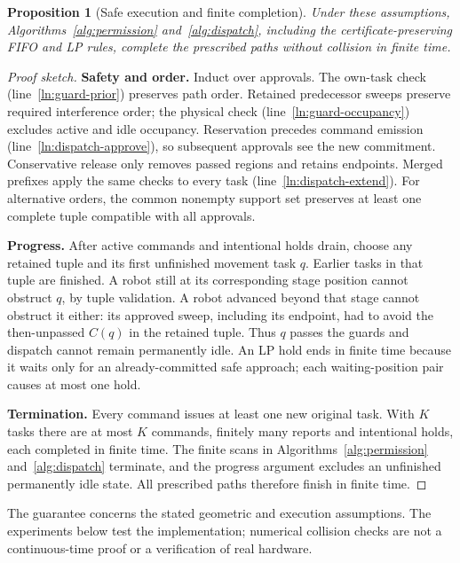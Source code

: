 \documentclass[11pt,a4paper]{article}
\newtheorem{proposition}{Proposition}
\theoremstyle{remark}
\begin{document}
\begin{proposition}[Safe execution and finite completion]
\label{prop:ordered}
\label{prop:controller}
\label{prop:policy-completion}
Under these assumptions, Algorithms~\ref{alg:permission} and~\ref{alg:dispatch},
including the certificate-preserving FIFO and LP rules, complete the
prescribed paths without collision in finite time.
\end{proposition}
\begin{proof}[Proof sketch]
\textbf{Safety and order.} Induct over approvals. The own-task check
(line~\ref{ln:guard-prior}) preserves path order. Retained predecessor sweeps
preserve required interference order; the physical check
(line~\ref{ln:guard-occupancy}) excludes active and idle occupancy.
Reservation precedes command emission (line~\ref{ln:dispatch-approve}),
so subsequent approvals see the new commitment. Conservative release only
removes passed regions and retains endpoints. Merged prefixes apply the
same checks to every task (line~\ref{ln:dispatch-extend}). For alternative
orders, the common nonempty support set preserves at least one complete
tuple compatible with all approvals.

\textbf{Progress.} After active commands and intentional holds drain,
choose any retained tuple and its first unfinished movement task $q$.
Earlier tasks in that tuple are finished. A robot still at its corresponding
stage position cannot obstruct $q$, by tuple validation. A robot advanced
beyond that stage cannot obstruct it either: its approved sweep, including
its endpoint, had to avoid the then-unpassed $C(q)$ in the retained tuple.
Thus $q$ passes the guards and dispatch cannot remain permanently idle.
An LP hold ends in finite time because it waits only for an already-committed
safe approach; each waiting-position pair causes at most one hold.

\textbf{Termination.} Every command issues at least one new original task.
With $K$ tasks there are at most $K$ commands, finitely many reports and
intentional holds, each completed in finite time. The finite scans in
Algorithms~\ref{alg:permission} and~\ref{alg:dispatch} terminate, and the
progress argument excludes an unfinished permanently idle state.
All prescribed paths therefore finish in finite time.
\end{proof}
The guarantee concerns the stated geometric and execution assumptions.
The experiments below test the implementation; numerical collision checks
are not a continuous-time proof or a verification of real hardware.
\end{document}
